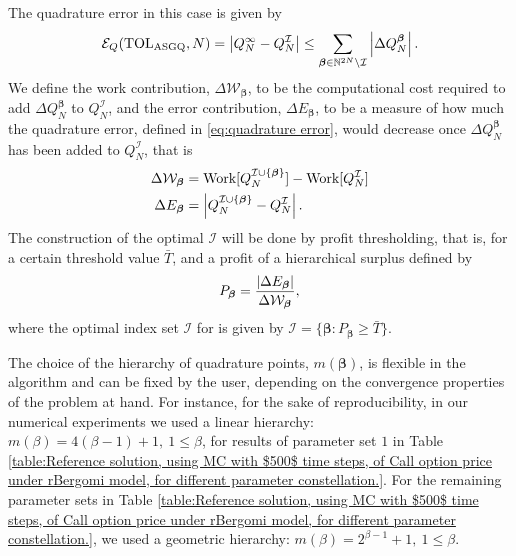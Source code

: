 The quadrature error in this  case  is given by
\begin{equation}\label{eq:quadrature error}
	\mathcal{E}_Q(\text{TOL}_{\text{ASGQ}},N) =\left\lvert Q_N^\infty - Q_N^\mathcal{I}\right\rvert \le \sum_{\boldsymbol{\beta} \in \mathbb{N}^{2N} \setminus
		\mathcal{I}} \left\lvert\Delta Q_N^{\boldsymbol{\beta}}\right\rvert.
\end{equation}
We define the work contribution, $\Delta \mathcal{W}_{\boldsymbol{\beta}}$, to be the computational cost  required to add  $\Delta Q_N^{\boldsymbol{\beta}}$ to $Q^{\mathcal{I}}_N$, and the error contribution, $\Delta E_{\boldsymbol{\beta}}$, to be  a measure of how much the quadrature error, defined in \eqref{eq:quadrature error}, would decrease once $\Delta Q_N^{\boldsymbol{\beta}}$  has been added to  $Q^{\mathcal{I}}_N$, that is 
\begin{align}\label{eq:Work_error_contributions}
\Delta \mathcal{W}_{\boldsymbol{\beta}} &= \text{Work}[Q^{\mathcal{I} \cup \{\boldsymbol{\beta}\}}_N]-\text{Work}[Q^{\mathcal{I}}_N] \nonumber\\
\Delta E_{\boldsymbol{\beta}} &= \left\lvert Q^{\mathcal{I} \cup \{\boldsymbol{\beta}\}}_N-Q^{\mathcal{I}}_N\right\rvert.
\end{align}
 The  construction of the optimal  $\mathcal{I}$ will be done by profit thresholding, that is, for a certain threshold value $\bar{T}$, and a profit of a hierarchical surplus defined by
 \begin{equation*}
 P_{\boldsymbol{\beta}}= \frac{\left\lvert\Delta E_{\boldsymbol{\beta}}\right\rvert}{\Delta\mathcal{W}_{\boldsymbol{\beta}}},
 \end{equation*}
  where the optimal index set  $\mathcal{I}$  for   is given by 
 $\mathcal{I}=\{\boldsymbol{\beta}: P_{\boldsymbol{\beta}}	 \ge \bar{T}\}$.
\begin{remark}
	The choice of the hierarchy of quadrature points, $m(\boldsymbol{\beta})$, is flexible in the  algorithm and can be fixed by the user, depending on the convergence properties of the problem at hand. For instance, for the sake of reproducibility, in our numerical experiments we used a linear hierarchy: $m(\beta)=4 (\beta-1)+1,\: 1 \le \beta $, for results of parameter set $1$ in Table \ref{table:Reference solution, using MC with $500$ time steps, of Call option price under rBergomi model, for different parameter constellation.}. For the remaining parameter sets in Table  \ref{table:Reference solution, using MC with $500$ time steps, of Call option price under rBergomi model, for different parameter constellation.}, we used a geometric hierarchy: $m(\beta)=2^{\beta-1}+1, \:1 \le \beta $.
\end{remark} 
